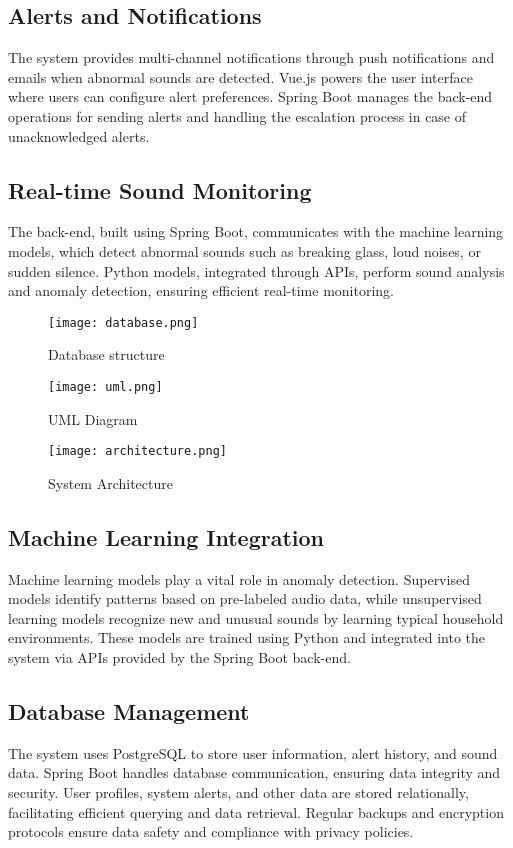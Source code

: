 \documentclass[conference]{IEEEtran}
\begin{document}
\subsection{Alerts and Notifications}
The system provides multi-channel notifications through push notifications and emails when abnormal sounds are detected. Vue.js powers the user interface where users can configure alert preferences. Spring Boot manages the back-end operations for sending alerts and handling the escalation process in case of unacknowledged alerts.

\subsection{Real-time Sound Monitoring}
 The back-end, built using Spring Boot, communicates with the machine learning models, which detect abnormal sounds such as breaking glass, loud noises, or sudden silence. Python models, integrated through APIs, perform sound analysis and anomaly detection, ensuring efficient real-time monitoring.

\begin{figure}[H]
    \centering
    \texttt{[image: database.png]}
    \caption{Database structure}
    \label{fig:database}
\end{figure}

\begin{figure}[H]
    \centering
    \texttt{[image: uml.png]}
    \caption{UML Diagram}
    \label{fig:uml}
\end{figure}

\begin{figure}[H]
    \centering
    \texttt{[image: architecture.png]}
    \caption{System Architecture}
    \label{fig:system_architecture}
\end{figure}

\subsection{Machine Learning Integration}
Machine learning models play a vital role in anomaly detection. Supervised models identify patterns based on pre-labeled audio data, while unsupervised learning models recognize new and unusual sounds by learning typical household environments. These models are trained using Python and integrated into the system via APIs provided by the Spring Boot back-end.

\subsection{Database Management}
The system uses PostgreSQL to store user information, alert history, and sound data. Spring Boot handles database communication, ensuring data integrity and security. User profiles, system alerts, and other data are stored relationally, facilitating efficient querying and data retrieval. Regular backups and encryption protocols ensure data safety and compliance with privacy policies.
\end{document}
